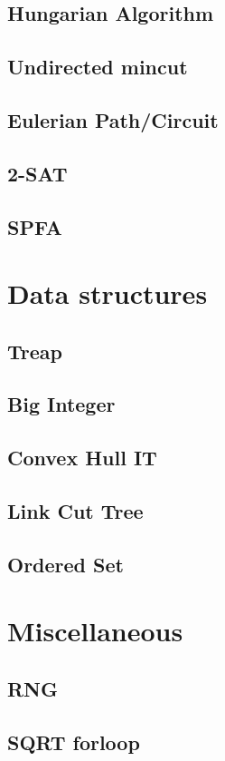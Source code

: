 \subsection{Hungarian Algorithm}
\raggedbottom
\hrulefill
\subsection{Undirected mincut}
\raggedbottom
\hrulefill
\subsection{Eulerian Path/Circuit}
\raggedbottom
\hrulefill
\subsection{2-SAT}
\raggedbottom
\hrulefill
\subsection{SPFA}
\raggedbottom
\hrulefill

\section{Data structures}
\subsection{Treap}
\raggedbottom
\hrulefill
\subsection{Big Integer}
\raggedbottom
\hrulefill
\subsection{Convex Hull IT}
\raggedbottom
\hrulefill
\subsection{Link Cut Tree}
\raggedbottom
\hrulefill
\subsection{Ordered Set}
\raggedbottom
\hrulefill

\section{Miscellaneous}
\subsection{RNG}
\raggedbottom
\hrulefill
\subsection{SQRT forloop}
\raggedbottom
\hrulefill

